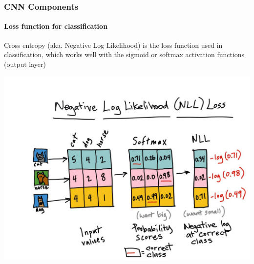 \documentclass[]{beamer}
\begin{document}
\begin{frame}
  \frametitle{CNN Components}
  \framesubtitle{Loss function for classification}
  \alert{Cross entropy} (aka. Negative Log Likelihood) is the loss function used in classification, which works well with the \alert{sigmoid} or \alert{softmax} activation functions (output layer)
  \begin{center}
    \includegraphics[width=0.7\linewidth]{resources/nll}
  \end{center}
\end{frame}



\end{document}
